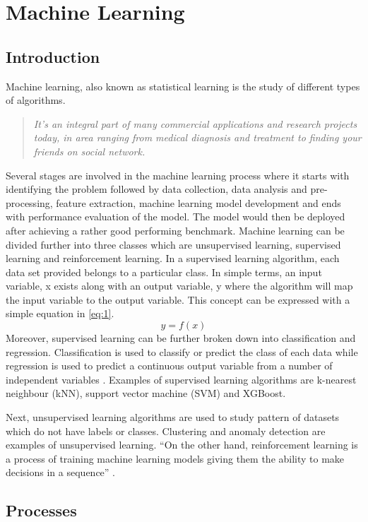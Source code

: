 \section{Machine Learning}
\subsection{Introduction}
Machine learning, also known as statistical learning is the study of different types of algorithms. 
\begin{quote}
\textit{It's an integral part of many commercial applications and research projects today, in area ranging from medical diagnosis and treatment to finding your friends on social network.} \cite{muller_guido_2016}
\end{quote}
Several stages are involved in the machine learning process where it starts with identifying the problem followed by data collection, data analysis and pre-processing, feature extraction, machine learning model development and ends with performance evaluation of the model. The model would then be deployed after achieving a rather good performing benchmark.
Machine learning can be divided further into three classes which are unsupervised learning, supervised learning and reinforcement learning. In a supervised learning algorithm, each data set provided belongs to a particular class. In simple terms, an input variable, x exists along with an output variable, y where the algorithm will map the input variable to the output variable. This concept can be expressed with a simple equation in \ref{eq:1}. 
\begin{equation}
    y = f(x)  \label{eq:1}
\end{equation}
Moreover, supervised learning can be further broken down into classification and regression. Classification is used to classify or predict the class of each data while regression is used to predict a continuous output variable from a number of independent variables \cite{abrams_2007}. Examples of supervised learning algorithms are k-nearest neighbour (kNN), support vector machine (SVM) and XGBoost.  

Next, unsupervised learning algorithms are used to study pattern of datasets which do not have labels or classes. Clustering and anomaly detection are examples of unsupervised learning. “On the other hand, reinforcement learning is a process of training machine learning models giving them the ability to make decisions in a sequence” \cite{osinski_budek_2018}. 

\subsection{Processes}
